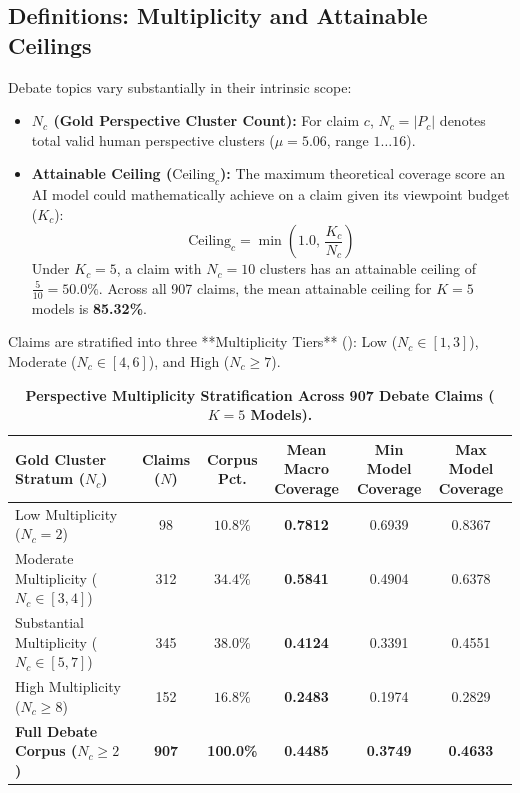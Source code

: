 \documentclass[11pt,a4paper]{article}
\begin{document}
\subsection{Definitions: Multiplicity and Attainable Ceilings}
Debate topics vary substantially in their intrinsic scope:
\begin{itemize}[leftmargin=*,itemsep=1pt]
    \item \textbf{$N_c$ (Gold Perspective Cluster Count):} For claim $c$, $N_c = |P_c|$ denotes total valid human perspective clusters ($\mu = 5.06$, range $1 \dots 16$).
    \item \textbf{Attainable Ceiling ($\text{Ceiling}_c$):} The maximum theoretical coverage score an AI model could mathematically achieve on a claim given its viewpoint budget ($K_c$):
    \begin{equation}
    \text{Ceiling}_c = \min\left(1.0, \, \frac{K_c}{N_c}\right)
    \end{equation}
    Under $K_c = 5$, a claim with $N_c = 10$ clusters has an attainable ceiling of $\frac{5}{10} = \mathbf{50.0\%}$. Across all 907 claims, the mean attainable ceiling for $K=5$ models is \textbf{85.32\%}.
\end{itemize}

Claims are stratified into three **Multiplicity Tiers** (): Low ($N_c \in [1, 3]$), Moderate ($N_c \in [4, 6]$), and High ($N_c \ge 7$).

\begin{table}[htbp]
\centering
\small
\caption{\textbf{Perspective Multiplicity Stratification Across 907 Debate Claims ($K=5$ Models).}}
\label{tab:multiplicity_stratification}
\begin{adjustbox}{max width=\linewidth}
\begin{tabular}{l c c c c c}
\toprule
\makecell{\textbf{Gold Cluster}\\\textbf{Stratum ($N_c$)}} & \makecell{\textbf{Claims}\\\textbf{($N$)}} & \makecell{\textbf{Corpus}\\\textbf{Pct.}} & \makecell{\textbf{Mean Macro}\\\textbf{Coverage}} & \makecell{\textbf{Min Model}\\\textbf{Coverage}} & \makecell{\textbf{Max Model}\\\textbf{Coverage}} \\
\midrule
Low Multiplicity ($N_c = 2$) & 98 & $10.8\%$ & \textbf{0.7812} & 0.6939 & 0.8367 \\
Moderate Multiplicity ($N_c \in [3, 4]$) & 312 & $34.4\%$ & \textbf{0.5841} & 0.4904 & 0.6378 \\
Substantial Multiplicity ($N_c \in [5, 7]$) & 345 & $38.0\%$ & \textbf{0.4124} & 0.3391 & 0.4551 \\
High Multiplicity ($N_c \ge 8$) & 152 & $16.8\%$ & \textbf{0.2483} & 0.1974 & 0.2829 \\
\midrule
\textbf{Full Debate Corpus ($N_c \ge 2$)} & \textbf{907} & \textbf{100.0\%} & \textbf{0.4485} & \textbf{0.3749} & \textbf{0.4633} \\
\bottomrule
\end{tabular}
\end{adjustbox}
\end{table}
\end{document}
